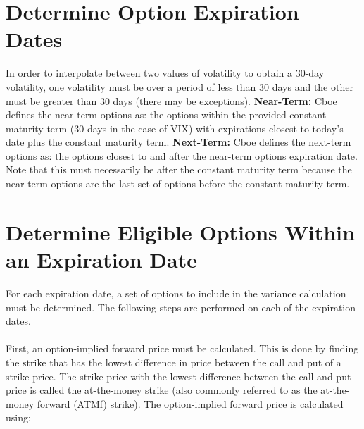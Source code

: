 \documentclass[11pt, oneside]{book}
\begin{document}
\section{Determine Option Expiration Dates} \label{CalcVix-DetermineDates}
In order to interpolate between two values of volatility to obtain a 30-day volatility, one volatility must be over a period of less than 30 days and the other must be greater than 30 days (there may be exceptions).
\textbf{Near-Term:} Cboe defines the near-term options as: the options within the provided constant maturity term (30 days in the case of VIX) with expirations closest to today's date plus the constant maturity term.
\textbf{Next-Term:} Cboe defines the next-term options as: the options closest to and after the near-term options expiration date. Note that this must necessarily be after the constant maturity term because the near-term options are the last set of options before the constant maturity term.

\section{Determine Eligible Options Within an Expiration Date} \label{CalcVix-DetermineEligible}
For each expiration date, a set of options to include in the variance calculation must be determined. The following steps are performed on each of the expiration dates.\\
\\
First, an option-implied forward price must be calculated. This is done by finding the strike that has the lowest difference in price between the call and put of a strike price. The strike price with the lowest difference between the call and put price is called the at-the-money strike (also commonly referred to as the at-the-money forward (ATMf) strike). The option-implied forward price is calculated using:
\end{document}
